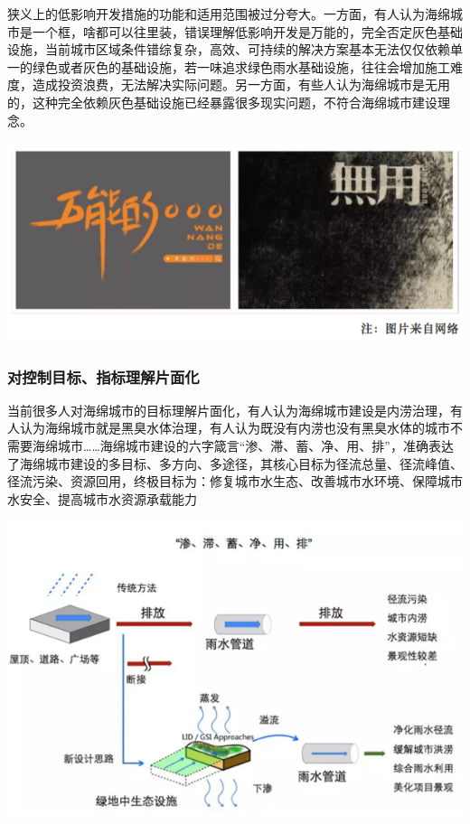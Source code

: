\documentclass[]{book}
\begin{document}
狭义上的低影响开发措施的功能和适用范围被过分夸大。一方面，有人认为海绵城市是一个框，啥都可以往里装，错误理解低影响开发是万能的，完全否定灰色基础设施，当前城市区域条件错综复杂，高效、可持续的解决方案基本无法仅仅依赖单一的绿色或者灰色的基础设施，若一味追求绿色雨水基础设施，往往会增加施工难度，造成投资浪费，无法解决实际问题。另一方面，有些人认为海绵城市是无用的，这种完全依赖灰色基础设施已经暴露很多现实问题，不符合海绵城市建设理念。

\includegraphics[width=8.33in]{images/hm3}

\hypertarget{ux5bf9ux63a7ux5236ux76eeux6807ux6307ux6807ux7406ux89e3ux7247ux9762ux5316}{%
\subsubsection{对控制目标、指标理解片面化}\label{ux5bf9ux63a7ux5236ux76eeux6807ux6307ux6807ux7406ux89e3ux7247ux9762ux5316}}

当前很多人对海绵城市的目标理解片面化，有人认为海绵城市建设是内涝治理，有人认为海绵城市就是黑臭水体治理，有人认为既没有内涝也没有黑臭水体的城市不需要海绵城市\ldots{}\ldots{}海绵城市建设的六字箴言``渗、滞、蓄、净、用、排''，准确表达了海绵城市建设的多目标、多方向、多途径，其核心目标为径流总量、径流峰值、径流污染、资源回用，终极目标为：修复城市水生态、改善城市水环境、保障城市水安全、提高城市水资源承载能力

\includegraphics[width=8.33in]{images/hm4}
\end{document}
